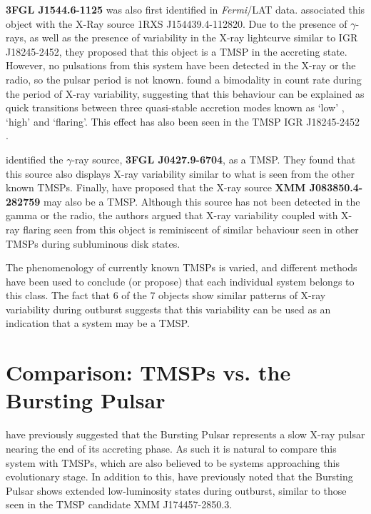 \par \textbf{3FGL J1544.6-1125} was also first identified in \textit{Fermi}/LAT data. \citealp{Bogdanov_Proxy} associated this object with the X-Ray source 1RXS J154439.4-112820. Due to the presence of $\gamma$-rays, as well as the presence of variability in the X-ray lightcurve similar to IGR J18245-2452, they proposed that this object is a TMSP in the accreting state. However, no pulsations from this system have been detected in the X-ray or the radio, so the pulsar period is not known. \citealp{Bogdanov_Proxy} found a bimodality in count rate during the period of X-ray variability, suggesting that this behaviour can be explained as quick transitions between three quasi-stable accretion modes known as `low' , `high' and `flaring'. This effect has also been seen in the TMSP IGR J18245-2452 \citep{Ferrigno_TMSPVar}.
\par \citealp{Strader_6} identified the $\gamma$-ray source, \textbf{3FGL J0427.9-6704}, as a TMSP. They found that this source also displays X-ray variability similar to what is seen from the other known TMSPs. Finally, \citealp{Rea_J0838} have proposed that the X-ray source \textbf{XMM J083850.4-282759} may also be a TMSP. Although this source has not been detected in the gamma or the radio, the authors argued that X-ray variability coupled with X-ray flaring seen from this object is reminiscent of similar behaviour seen in other TMSPs during subluminous disk states.
\par The phenomenology of currently known TMSPs is varied, and different methods have been used to conclude (or propose) that each individual system belongs to this class. The fact that 6 of the 7 objects show similar patterns of X-ray variability during outburst suggests that this variability can be used as an indication that a system may be a TMSP.

\section{Comparison: TMSPs vs. the Bursting Pulsar}

\par \citealp{Rappaport_BPHistory} have previously suggested that the Bursting Pulsar represents a slow X-ray pulsar nearing the end of its accreting phase. As such it is natural to compare this system with TMSPs, which are also believed to be systems approaching this evolutionary stage. In addition to this, \citealp{Degenaar_174457} have previously noted that the Bursting Pulsar shows extended low-luminosity states during outburst, similar to those seen in the TMSP candidate XMM J174457-2850.3.

